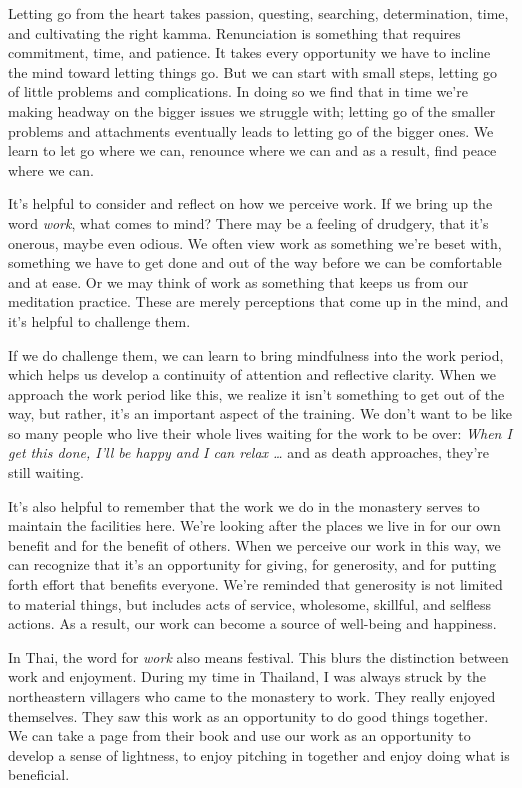 Letting go from the heart takes passion, questing, searching, 
determination, time, and cultivating the right kamma. Renunciation is 
something that requires commitment, time, and patience. It takes every 
opportunity we have to incline the mind toward letting things go. But 
we can start with small steps, letting go of little problems and 
complications. In doing so we find that in time we're making headway on 
the bigger issues we struggle with; letting go of the smaller problems 
and attachments eventually leads to letting go of the bigger ones. We 
learn to let go where we can, renounce where we can and as a result, 
find peace where we can.


It's helpful to consider and reflect on how we perceive work. If we 
bring up the word \emph{work}, what comes to mind? There may be a 
feeling of drudgery, that it's onerous, maybe even odious. We often 
view work as something we're beset with, something we have to get done 
and out of the way before we can be comfortable and at ease. Or we may 
think of work as something that keeps us from our meditation practice. 
These are merely perceptions that come up in the mind, and it's helpful 
to challenge them.

If we do challenge them, we can learn to bring mindfulness into the 
work period, which helps us develop a continuity of attention and 
reflective clarity. When we approach the work period like this, we 
realize it isn't something to get out of the way, but rather, it's an 
important aspect of the training. We don't want to be like so many 
people who live their whole lives waiting for the work to be over: 
\emph{When I get this done, I'll be happy and I can relax \ldots{}} and 
as death approaches, they're still waiting.

It's also helpful to remember that the work we do in the monastery
serves to maintain the facilities here. We're looking after the places
we live in for our own benefit and for the benefit of others. When we
perceive our work in this way, we can recognize that it's an opportunity
for giving, for generosity, and for putting forth effort that benefits
everyone. We're reminded that generosity is not limited to material
things, but \mbox{includes} acts of service, wholesome, skillful, and
selfless actions. As a result, our work can become a source of
well-being and happiness.

In Thai, the word for \emph{work} also means festival. This blurs the 
distinction between work and enjoyment. During my time in Thailand, I 
was always struck by the northeastern villagers who came to the 
monastery to work. They really enjoyed themselves. They saw this work 
as an opportunity to do good things together. We can take a page from 
their book and use our work as an opportunity to develop a sense of 
lightness, to enjoy pitching in together and enjoy doing what is 
beneficial.

